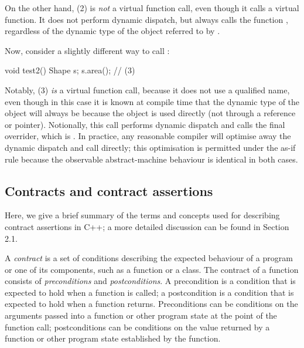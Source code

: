 On the other hand, (2) is \emph{not} a virtual function call, even though it calls a virtual function. It does not perform dynamic dispatch, but always calls the function , regardless of the dynamic type of the object referred to by .

Now, consider a slightly different way to call :

\begin{codeblock}
void test2() {
  Shape s;
  s.area(); // (3)
}
\end{codeblock}

Notably, (3) \emph{is} a virtual function call, because it does not use a qualified name, even though in this case it is known at compile time that the dynamic type of the object  will always be  because the object is used directly (not through a reference or pointer). Notionally, this call performs dynamic dispatch and calls the final overrider, which is . In practice, any reasonable compiler will optimise away the dynamic dispatch and call  directly; this optimisation is permitted under the as-if rule because the observable abstract-machine behaviour is identical in both cases.

\subsection{Contracts and contract assertions}

Here, we give a brief summary of the terms and concepts used for describing contract assertions in C++; a more detailed discussion can be found in \cite{P2900R14} Section 2.1.

A \emph{contract} is a set of conditions describing the expected behaviour of a program or one of its components, such as a function or a class. The contract of a function consists of \emph{preconditions} and \emph{postconditions}. A precondition is a condition that is expected to hold when a function is called; a postcondition is a condition that is expected to hold when a function returns. Preconditions can be conditions on the arguments passed into a function or other program state at the point of the function call; postconditions can be conditions on the value returned by a function or other program state established by the function.

